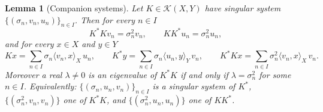 \documentclass[a4paper]{report}
\theoremstyle{plain}
\newtheorem{lemma}[theorem]{Lemma}
\theoremstyle{definition}
\theoremstyle{remark}
\begin{document}
\begin{lemma}[Companion systems]
  \label{lem_svd_companion}
  Let $K \in \mathcal{K}(X,Y)$ have singular system $\{(\sigma_n,v_n,u_n)\}_{n \in I}$.
  Then for every $n \in I$
  \[
    K^*Kv_n = \sigma_n^2 v_n, \qquad KK^*u_n = \sigma_n^2 u_n ,
  \]
  and for every $x \in X$ and $y \in Y$
  \[
    Kx = \sum_{n \in I} \sigma_n \langle v_n, x\rangle_X\, u_n, \qquad
    K^*y = \sum_{n \in I} \sigma_n \langle u_n, y\rangle_Y\, v_n,
    \qquad
    K^*Kx = \sum_{n \in I} \sigma_n^2 \langle v_n, x\rangle_X\, v_n .
  \]
  Moreover a real $\lambda \ne 0$ is an eigenvalue of $K^*K$ if and only if
  $\lambda = \sigma_n^2$ for some $n \in I$.
  Equivalently: $\{(\sigma_n,u_n,v_n)\}_{n\in I}$ is a singular system of $K^*$,
  $\{(\sigma_n^2,v_n,v_n)\}$ one of $K^*K$, and $\{(\sigma_n^2,u_n,u_n)\}$ one of $KK^*$.
\end{lemma}
\end{document}
